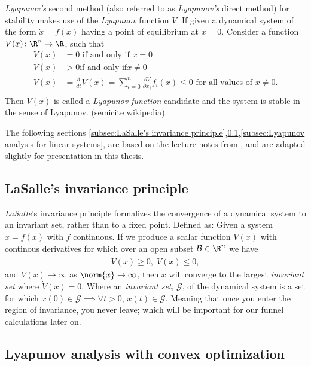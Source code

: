 \textit{Lyapunov's} second method (also referred to as \textit{Lyapunov's}
direct method) for stability makes use of the \textit{Lyapunov} function \(V\).
If given a dynamical system of the form \(\dot{x} = f(x)\) having a point of
equilibrium at \(x = 0\). Consider a function \(V(x) \colon \R^n \rightarrow
\R\), such that
\begin{align*}
  V(x) &= 0 \text{ if and only if } x = 0 \\
  V(x) &> 0 \text{if and only if} x \neq 0 \\
  \dot{V}(x) &= \frac{d}{dt}V(x) = \sum_{i=0}^{n} \frac{\partial V}{\partial x_i} f_i(x) \leq 0 \text{ for all values of } x \neq 0. \\
\end{align*}
Then \(V(x)\) is called a \textit{Lyapunov function} candidate and the system is
stable in the sense of Lyapunov. (semicite wikipedia).

The following sections \ref{subsec:LaSalle's invariance
  principle},\ref{subsec:LaSalle's invariance principle},\ref{subsec:Lyapunov
  analysis for linear systems}, are based on the lecture notes from
\cite{tedrakeUnderactuatedRoboticsAlgorithms2019}, and are adapted slightly for
presentation in this thesis.

\subsection{LaSalle's invariance principle}
\label{subsec:LaSalle's invariance principle}

\textit{LaSalle}'s invariance principle formalizes the convergence of a
dynamical system to an invariant set, rather than to a fixed point. Defined as:
Given a system \(\dot{x} = f(x)\) with \(f\) continuous. If we produce a scalar
function \(V(x)\) with continous derivatives for which over an open subset
\(\mathcal{B} \in \R^n\) we have
\begin{align*}
  V(x) \geq 0, \; \dot{V}(x) \leq 0,
\end{align*}
and \(V(x) \rightarrow \infty\) as \(\norm{x} \rightarrow \infty\), then \(x\)
will converge to the largest \textit{invariant set} where \(\dot{V}(x) = 0\).
Where an \textit{invariant set}, \(\mathcal{G}\), of the dynamical system is a
set for which \(x(0) \in \mathcal{G} \implies \forall t > 0,\, x(t) \in
\mathcal{G}\). Meaning that once you enter the region of invariance, you never
leave; which will be important for our funnel calculations later on.

\subsection{Lyapunov analysis with convex optimization}
\label{subsec:Lyapunov analysis with convex optimization}

